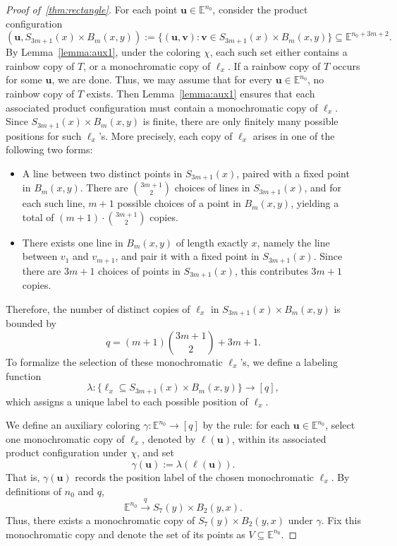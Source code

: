 \documentclass[11pt]{article}
\theoremstyle{definition}
\begin{document}
\begin{proof}[Proof of~\cref{thm:rectangle}]
 For each point \(\boldsymbol{u} \in \mathbb{E}^{n_0}\), consider the product configuration
\[
(\boldsymbol{u}, S_{3m+1}(x) \times B_m(x, y)) := \{(\boldsymbol{u}, \boldsymbol{v}) : \boldsymbol{v} \in S_{3m+1}(x) \times B_m(x, y)\} \subseteq \mathbb{E}^{n_0 + 3m + 2}.
\]
By Lemma~\ref{lemma:aux1}, under the coloring \(\chi\), each such set either contains a rainbow copy of \(T\), or a monochromatic copy of \(\ell_x\). If a rainbow copy of \(T\) occurs for some \(\boldsymbol{u}\), we are done. Thus, we may assume that for every \(\boldsymbol{u} \in \mathbb{E}^{n_0}\), no rainbow copy of \(T\) exists. Then Lemma~\ref{lemma:aux1} ensures that each associated product configuration must contain a monochromatic copy of \(\ell_x\). Since \(S_{3m+1}(x) \times B_m(x, y)\) is finite, there are only finitely many possible positions for such \(\ell_x\)'s. More precisely, each copy of \(\ell_x\) arises in one of the following two forms:
\begin{itemize}
    \item A line between two distinct points in \(S_{3m+1}(x)\), paired with a fixed point in \(B_m(x,y)\). There are \(\binom{3m+1}{2}\) choices of lines in \(S_{3m+1}(x)\), and for each such line, \(m+1\) possible choices of a point in \(B_m(x,y)\), yielding a total of \((m+1) \cdot \binom{3m+1}{2} \) copies.
    
    \item There exists one line in \(B_m(x,y)\) of length exactly \(x\), namely the line between \(v_1\) and \(v_{m+1}\), and pair it with a fixed point in \(S_{3m+1}(x)\). Since there are \(3m+1\) choices of points in \(S_{3m+1}(x)\), this contributes \(3m+1\) copies.
\end{itemize}
Therefore, the number of distinct copies of \(\ell_x\) in \(S_{3m+1}(x) \times B_m(x, y)\) is bounded by
\[
q= (m+1)\binom{3m+1}{2} + 3m+1.
\]
To formalize the selection of these monochromatic \(\ell_x\)'s, we define a labeling function
\[
\lambda : \{ \ell_x \subseteq S_{3m+1}(x) \times B_m(x,y) \} \to [q],
\]
which assigns a unique label to each possible position of \(\ell_x\).


We define an auxiliary coloring \(\gamma : \mathbb{E}^{n_0} \to [q]\) by the rule:
for each \(\boldsymbol{u} \in \mathbb{E}^{n_0}\), select one monochromatic copy of \(\ell_x\), denoted by \(\ell(\boldsymbol{u})\), within its associated product configuration under \(\chi\), and set
\[
\gamma(\boldsymbol{u}) := \lambda( \ell(\boldsymbol{u}) ).
\]
That is, \(\gamma(\boldsymbol{u})\) records the position label of the chosen monochromatic \(\ell_x\). By definitions of \(n_{0}\) and \(q\),
\[
\mathbb{E}^{n_0} \overset{q}{\rightarrow} S_7(y) \times B_2(y, x).
\]
Thus, there exists a monochromatic copy of \(S_7(y) \times B_2(y, x)\) under \(\gamma\). Fix this monochromatic copy and denote the set of its points as \(V \subseteq \mathbb{E}^{n_0}\).


\end{proof}
\end{document}
